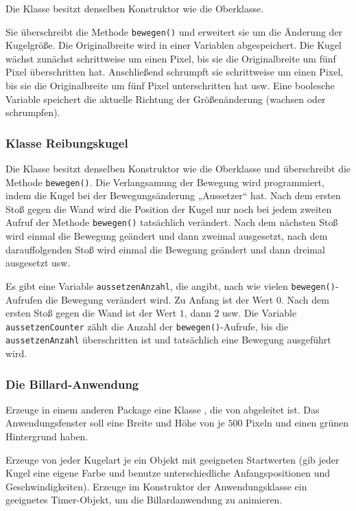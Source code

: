 Die Klasse  besitzt denselben Konstruktor wie die
Oberklasse.

Sie überschreibt die Methode \verb|bewegen()| und erweitert sie um die Änderung
der Kugelgröße. Die Originalbreite wird in einer Variablen abgespeichert. Die
Kugel wächst zunächst schrittweise um einen Pixel, bis sie die Originalbreite um
fünf Pixel überschritten hat. Anschließend schrumpft sie schrittweise um einen
Pixel, bis sie die Originalbreite um fünf Pixel unterschritten hat usw. Eine
boolesche Variable speichert die aktuelle Richtung der Größenänderung (wachsen
oder schrumpfen).


\subsubsection{Klasse Reibungskugel}

Die Klasse  besitzt denselben Konstruktor wie die
Oberklasse und überschreibt die Methode \lstinline|bewegen()|. Die Verlangsamung
der Bewegung wird programmiert, indem die Kugel bei der Bewegungsänderung
„Aussetzer“ hat. Nach dem ersten Stoß gegen die Wand wird die Position der
Kugel nur noch bei jedem zweiten Aufruf der Methode \lstinline|bewegen()| tatsächlich
verändert. Nach dem nächsten Stoß wird einmal die Bewegung geändert und dann
zweimal ausgesetzt, nach dem darauffolgenden Stoß wird einmal die Bewegung
geändert und dann dreimal ausgesetzt usw.

Es gibt eine Variable \lstinline|aussetzenAnzahl|, die angibt, nach wie vielen
\lstinline|bewegen()|-Aufrufen die Bewegung verändert wird. Zu Anfang ist der Wert $0$.
Nach dem ersten Stoß gegen die Wand ist der Wert $1$, dann $2$ usw.
Die Variable \lstinline|aussetzenCounter| zählt die Anzahl der
\lstinline|bewegen()|-Aufrufe, bis die \lstinline|aussetzenAnzahl| überschritten ist und
tatsächlich eine Bewegung ausgeführt wird.


\subsubsection{Die Billard-Anwendung}

Erzeuge in einem anderen Package eine Klasse , die von
 abgeleitet ist. Das Anwendungsfenster soll eine Breite und
Höhe von je $500$ Pixeln und einen grünen Hintergrund haben.

Erzeuge von jeder Kugelart je ein Objekt mit geeigneten Startwerten (gib jeder
Kugel eine eigene Farbe und benutze unterschiedliche Anfangspositionen und
Geschwindigkeiten). Erzeuge im Konstruktor der Anwendungsklasse ein geeignetes
Timer-Objekt, um die Billardanwendung zu animieren.